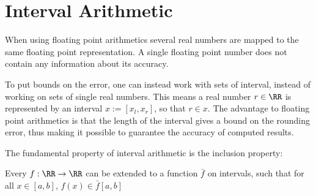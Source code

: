 \section{Interval Arithmetic}
	When using floating point arithmetics several real numbers are mapped to the same floating point representation.
	A single floating point number does not contain any information about its accuracy.

	To put bounds on the error, one can instead work with sets of interval, instead of working on sets of single real numbers.
	This means a real number $r \in \RR$ is represented by an interval $x := [x_l,x_r]$, so that $r \in x$.
	The advantage to floating point arithmetics is that the length of the interval gives a bound on the rounding error, 
	thus making it possible to guarantee the accuracy of computed results.

	The fundamental property of interval arithmetic is the inclusion property:

	Every $f: \RR \to \RR$ can be extended to a function $\bar f$ on intervals, such that for all $x \in [a,b]$, $f(x) \in \bar f[a,b]$ 


